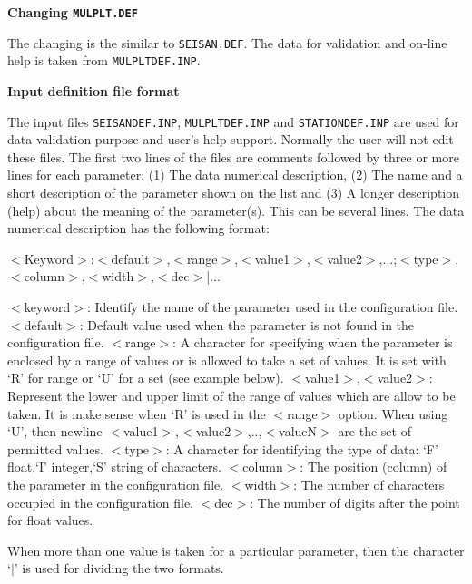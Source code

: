 \textbf{Changing \texttt{MULPLT.DEF}}

The changing is the similar to \texttt{SEISAN.DEF}. The data for validation 
and on-line help is taken from \texttt{MULPLTDEF.INP}. 

\textbf{Input definition file format}

The input files \texttt{SEISANDEF.INP}, \texttt{MULPLTDEF.INP} and 
\texttt{STATIONDEF.INP} are used for data validation purpose and 
user's help support. Normally the user will not edit these files. The first two lines of the files are comments followed by three or more lines for each parameter: (1) The data numerical description, (2) The name and a short description of the parameter shown on the list and 
(3) A longer description (help) about the meaning of the parameter(s). This can be several lines. The data numerical description has the following format: 

$<$Keyword$>$:$<$default$>$,$<$range$>$,$<$value1$>$,$<$value2$>$,...;$<$type$>$,$<$column$>$,$<$width$>$,$<$dec$>$|... 

$<$keyword$>$: Identify the name of the parameter used in the configuration file.\newline
$<$default$>$: Default value used when the parameter is not found in the configuration file.\newline
$<$range$>$: A character for specifying when the parameter is enclosed by a range of values or is allowed to take a set of values. It is set with `R' for range or `U' for a set (see example below). \newline
$<$value1$>$,$<$value2$>$: Represent the lower and upper limit of the range of values which are allow to be 
taken. It is make sense when `R' is used in the $<$range$>$ option. When using `U', then newline
$<$value1$>$,$<$value2$>$,..,$<$valueN$>$ are the set of permitted values. \newline
$<$type$>$: A character for identifying the type of data: `F' float,`I' integer,`S' string of characters. \newline
$<$column$>$: The position (column) of the parameter in the configuration file. \newline
$<$width$>$: The number of characters occupied in the configuration file. \newline
$<$dec$>$: The number of digits after the point for float values. 

When more than one value is taken for a particular parameter, then the character `$|$' is used for 
dividing the two formats. 


